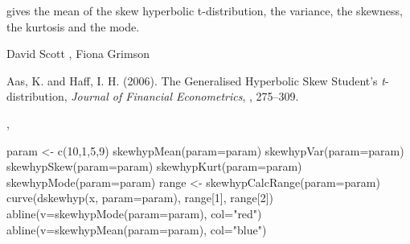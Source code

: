 \begin{Value}
 gives the mean of the skew hyperbolic
t-distribution,  the variance,  the
skewness,  the kurtosis and  the
mode.
\end{Value}
\begin{Author}\relax
David Scott , Fiona Grimson
\end{Author}
\begin{References}\relax
Aas, K. and Haff, I. H. (2006).
The Generalised Hyperbolic Skew Student's \emph{t}-distribution,
\emph{Journal of Financial Econometrics}, , 275--309.
\end{References}
\begin{SeeAlso}\relax
{}, 
\end{SeeAlso}
\begin{Examples}
\begin{ExampleCode}
param <- c(10,1,5,9)
skewhypMean(param=param)
skewhypVar(param=param)
skewhypSkew(param=param)
skewhypKurt(param=param)
skewhypMode(param=param)
range <- skewhypCalcRange(param=param)
curve(dskewhyp(x, param=param), range[1], range[2])
abline(v=skewhypMode(param=param), col="red")
abline(v=skewhypMean(param=param), col="blue")
\end{ExampleCode}
\end{Examples}

